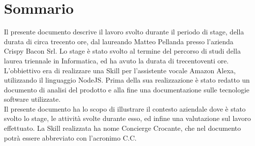 
\cleardoublepage
{}
{}
\begingroup
\let\clearpage\relax
\let\cleardoublepage\relax
\let\cleardoublepage\relax

\chapter*{Sommario}

Il presente documento descrive il lavoro svolto durante il periodo di stage, della durata di circa trecento ore, dal laureando Matteo Pellanda presso l'azienda Crispy Bacon Srl. Lo stage è stato svolto al termine del percorso di studi della laurea triennale in Informatica, ed ha avuto la durata di trecentoventi ore.\\[0.4cm]
L'obbiettivo era di realizzare una Skill per l'assistente vocale Amazon Alexa, utilizzando il linguaggio NodeJS. Prima della sua realizzazione è stato redatto un documento di analisi del prodotto e alla fine una documentazione sulle tecnologie software utilizzate.\\[0.4cm]
Il presente documento ha lo scopo di illustrare il contesto aziendale dove è stato svolto lo stage, le attività svolte durante esso, ed infine una valutazione sul lavoro effettuato.
La Skill realizzata ha nome Concierge Crocante, che nel documento potrà essere abbreviato con l'acronimo C.C.  

%
%

\endgroup			

\vfill

